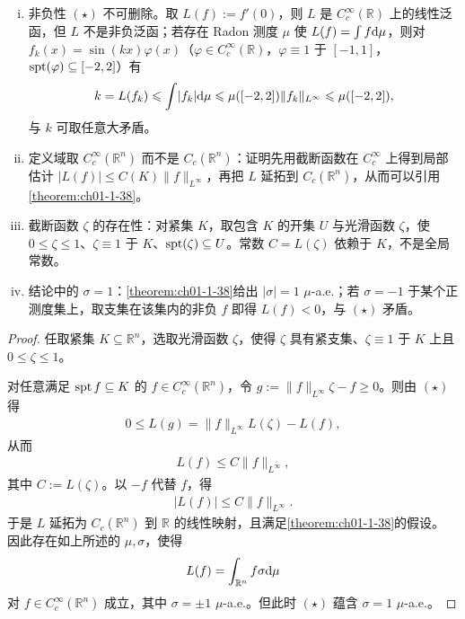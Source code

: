 \documentclass[../../main.tex]{subfiles}%
\begin{document}
\begin{remark}\label{remark:ch01-thm-1-39-条件}
\begin{enumerate}[(i)]
\item 非负性 $(\star)$ 不可删除。取 $L(f):=f'(0)$，则 $L$ 是 $C_c^{\infty}(\mathbb{R})$ 上的线性泛函，但 $L$ 不是非负泛函；若存在 Radon 测度 $\mu$ 使 $L(f)=\int f\mathrm{d}\mu$，则对 $f_k(x)=\sin(kx)\varphi(x)$（$\varphi\in C_c^{\infty}(\mathbb{R})$，$\varphi\equiv1$ 于 $[-1,1]$，$\operatorname{spt}(\varphi)\subseteq[-2,2]$）有
\begin{align*}
k=L(f_k)\leqslant\int\lvert f_k\rvert\mathrm{d}\mu\leqslant\mu([-2,2])\lVert f_k\rVert_{L^{\infty}}\leqslant\mu([-2,2]),
\end{align*}
与 $k$ 可取任意大矛盾。
\item 定义域取 $C_c^{\infty}(\mathbb{R}^n)$ 而不是 $C_c(\mathbb{R}^n)$：证明先用截断函数在 $C_c^{\infty}$ 上得到局部估计 $\lvert L(f)\rvert\leqslant C(K)\lVert f\rVert_{L^{\infty}}$，再把 $L$ 延拓到 $C_c(\mathbb{R}^n)$，从而可以引用\cref{theorem:ch01-1-38}。%
\item 截断函数 $\zeta$ 的存在性：对紧集 $K$，取包含 $K$ 的开集 $U$ 与光滑函数 $\zeta$，使 $0\leqslant\zeta\leqslant1$、$\zeta\equiv1$ 于 $K$、$\operatorname{spt}(\zeta)\subseteq U$。常数 $C=L(\zeta)$ 依赖于 $K$，不是全局常数。
\item 结论中的 $\sigma=1$：\cref{theorem:ch01-1-38}给出 $\lvert\sigma\rvert=1$ $\mu$-a.e.；若 $\sigma=-1$ 于某个正测度集上，取支集在该集内的非负 $f$ 即得 $L(f)<0$，与 $(\star)$ 矛盾。%
\end{enumerate}
\end{remark}

\begin{proof}
任取紧集 $K\subseteq\mathbb{R}^n$，选取光滑函数 $\zeta$，使得 $\zeta$ 具有紧支集、$\zeta\equiv1$ 于 $K$ 上且 $0\leqslant\zeta\leqslant1$。

对任意满足 $\operatorname{spt} f\subseteq K$ 的 $f\in C_c^{\infty}(\mathbb{R}^n)$，令 $g:=\lVert f\rVert_{L^{\infty}}\zeta-f\geqslant0$。则由 $(\star)$ 得
\begin{align*}
0\leqslant L(g)=\lVert f\rVert_{L^{\infty}}L(\zeta)-L(f),
\end{align*}
从而
\begin{align*}
L(f)\leqslant C\lVert f\rVert_{L^{\infty}},
\end{align*}
其中 $C:=L(\zeta)$。以 $-f$ 代替 $f$，得
\begin{align*}
\lvert L(f)\rvert\leqslant C\lVert f\rVert_{L^{\infty}}.
\end{align*}
于是 $L$ 延拓为 $C_c(\mathbb{R}^n)$ 到 $\mathbb{R}$ 的线性映射，且满足\cref{theorem:ch01-1-38}的假设。%
因此存在如上所述的 $\mu,\sigma$，使得
\begin{align*}
L(f)=\int_{\mathbb{R}^n}f\sigma\mathrm{d}\mu
\end{align*}
对 $f\in C_c^{\infty}(\mathbb{R}^n)$ 成立，其中 $\sigma=\pm1$ $\mu$-a.e.。但此时 $(\star)$ 蕴含 $\sigma=1$ $\mu$-a.e.。
\end{proof}
\end{document}
